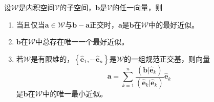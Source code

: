 \documentclass[main.tex]{subfiles}
\begin{document}
\begin{theorem}[最好近似的表示]\label{thm:A.3}
    设$\mathcal{W}$是内积空间$\mathcal{V}$的子空间，$\mathbf{b}$是$\mathcal{V}$的任一向量，则
    \begin{enumerate}
        \item 当且仅当$\mathbf{a}\in\mathcal{W}$与$\mathbf{b}-\mathbf{a}$正交时，$\mathbf{a}$是$\mathbf{b}$在$\mathcal{W}$中的最好近似。
        \item $\mathbf{b}$在$\mathcal{W}$中总存在唯一一个最好近似。
        \item 若$\mathcal{W}$是有限维的，$\left\{\mathbf{\hat{e}}_1,\cdots\mathbf{\hat{e}}_n\right\}$是$\mathcal{W}$的一组规范正交基，则向量
              \[\mathbf{a}=\sum_{k=1}^n\frac{\left(\mathbf{b}|\mathbf{\hat{e}}_k\right)}{\left(\mathbf{\hat{e}}_k|\mathbf{\hat{e}}_k\right)}\mathbf{\hat{e}}_k\]
              是$\mathbf{b}$在$\mathcal{W}$中的唯一最小近似。
    \end{enumerate}
\end{theorem}
\end{document}
